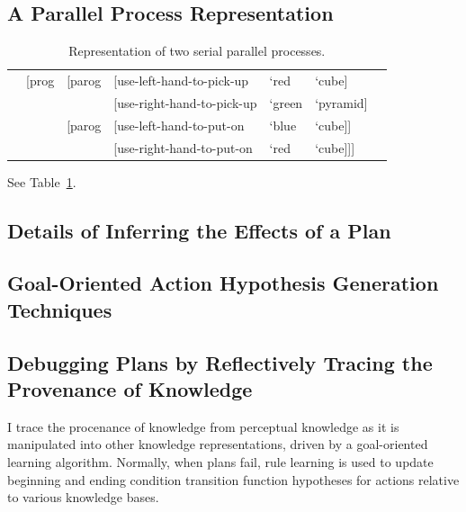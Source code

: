 \subsection{A Parallel Process Representation}
\label{sec:parallel_process_representation}

\begin{table}
  \myfloatalign
  \begin{tabularx}{\textwidth}{XlllllX}
    & [prog & [parog & [use-left-hand-to-pick-up  & `red   & `cube]    & \\
    &       &        & [use-right-hand-to-pick-up & `green & `pyramid] & \\
    &       & [parog & [use-left-hand-to-put-on   & `blue  & `cube]]   & \\
    &       &        & [use-right-hand-to-put-on  & `red   & `cube]]]  & \\
  \end{tabularx}
  \caption[Representation of two serial parallel processes]{Representation of two serial parallel processes.}
  \label{tab:parallel_process_representation}
\end{table}

See Table~\ref{tab:parallel_process_representation}.


\subsection{Details of Inferring the Effects of a Plan}
\label{sec:details_of_inferring_the_effects_of_a_plan}



\subsection{Goal-Oriented Action Hypothesis Generation Techniques}
\label{sec:goal_oriented_action_hypotheses_generation_techniques}


\subsection{Debugging Plans by Reflectively Tracing the Provenance of Knowledge}

I trace the procenance of knowledge from perceptual knowledge as it
is manipulated into other knowledge representations, driven by a
goal-oriented learning algorithm.  Normally, when plans fail, rule
learning is used to update beginning and ending condition transition
function hypotheses for actions relative to various knowledge bases.

